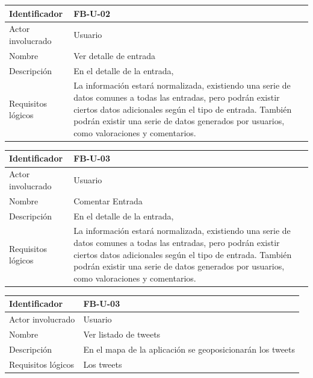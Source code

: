 \begin{table}[h!]
\centering
\begin{tabular}{|p{3cm}|p{10cm}|}
\hline
Identificador & FB-U-02 \\ \hline
Actor involucrado & Usuario \\ \hline
Nombre & Ver detalle de entrada \\ \hline
Descripción & En el detalle de la entrada,  \\ \hline
Requisitos lógicos & La información estará normalizada, existiendo una serie de datos comunes a todas las entradas, pero podrán existir ciertos datos adicionales según el tipo de entrada. También podrán existir una serie de datos generados por usuarios, como valoraciones y comentarios. \\ \hline
\end{tabular}
\end{table}


\begin{table}[h!]
\centering
\begin{tabular}{|p{3cm}|p{10cm}|}
\hline
Identificador & FB-U-03 \\ \hline
Actor involucrado & Usuario \\ \hline
Nombre & Comentar Entrada\\ \hline
Descripción & En el detalle de la entrada,  \\ \hline
Requisitos lógicos & La información estará normalizada, existiendo una serie de datos comunes a todas las entradas, pero podrán existir ciertos datos adicionales según el tipo de entrada. También podrán existir una serie de datos generados por usuarios, como valoraciones y comentarios. \\ \hline
\end{tabular}
\end{table}

\begin{table}[h!]
\centering
\begin{tabular}{|p{3cm}|p{10cm}|}
\hline
Identificador & FB-U-03 \\ \hline
Actor involucrado & Usuario \\ \hline
Nombre & Ver listado de tweets\\ \hline
Descripción & En el mapa de la aplicación se geoposicionarán los tweets  \\ \hline
Requisitos lógicos & Los tweets \\ \hline
\end{tabular}
\end{table}


